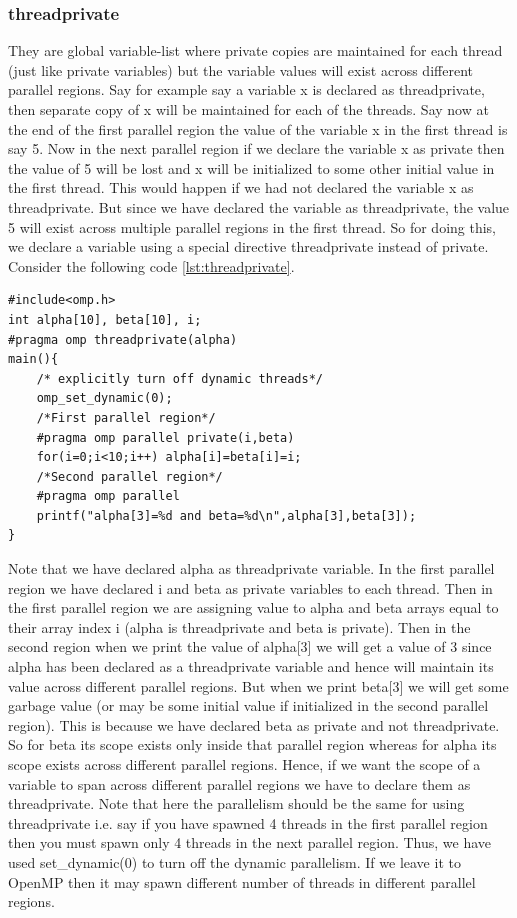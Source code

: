 \documentclass[12pt]{book}
\begin{document}
\subsubsection{threadprivate}
They are global variable-list where private copies are maintained for each thread (just like private variables) but the variable values will exist across different parallel regions. Say for example say a variable x is declared as threadprivate, then separate copy of x will be maintained for each of the threads. Say now at the end of the first parallel region the value of the variable x in the first thread is say 5. Now in the next parallel region if we declare the variable x as private then the value of 5 will be lost and x will be initialized to some other initial value in the first thread. This would happen if we had not declared the variable x as threadprivate. But since we have declared the variable as threadprivate, the value 5 will exist across multiple parallel regions in the first thread. So for doing this, we declare a variable using a special directive threadprivate instead of private. Consider the following code \ref{lst:threadprivate}.
\begin{lstlisting}[caption={threadprivate Directive},captionpos=b,label={lst:threadprivate}]
#include<omp.h>
int alpha[10], beta[10], i;
#pragma omp threadprivate(alpha)
main(){
    /* explicitly turn off dynamic threads*/
    omp_set_dynamic(0);
    /*First parallel region*/
    #pragma omp parallel private(i,beta)
    for(i=0;i<10;i++) alpha[i]=beta[i]=i;
    /*Second parallel region*/
    #pragma omp parallel
    printf("alpha[3]=%d and beta=%d\n",alpha[3],beta[3]);
}
\end{lstlisting}
Note that we have declared alpha as threadprivate variable.
In the first parallel region we have declared i and beta as private variables to each thread.  Then in the first parallel region we are assigning value to alpha and beta arrays equal to their array index i (alpha is threadprivate and beta is private).
Then in the second region when we print the value of alpha[3] we will get a value of 3 since alpha has been declared as a threadprivate variable and hence will maintain its value across different parallel regions. But when we print beta[3] we will get some garbage value (or may be some initial value if initialized in the second parallel region). This is because we have declared beta as private and not threadprivate. So for beta its scope exists only inside that parallel region whereas for alpha its scope exists across different parallel regions. Hence, if we want the scope of a variable to span across different parallel regions we have to declare them as threadprivate. Note that here the parallelism should be the same for using threadprivate i.e. say if you have spawned 4 threads in the first parallel region then you must spawn only 4 threads in the next parallel region. Thus, we have used set\_dynamic(0) to turn off the dynamic parallelism. If we leave it to OpenMP then it may spawn different number of threads in different parallel regions.
\end{document}
